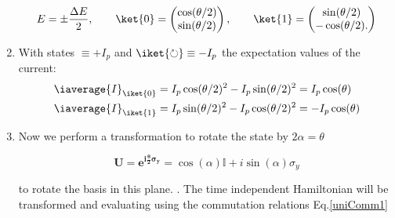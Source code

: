 \begin{enumerate}
 \begin{equation}
   E = \pm \frac{\Delta E}{2}, \qquad \ket{0} = \begin{pmatrix}
     \cos(\theta/2) \\ \sin(\theta/2)
   \end{pmatrix},  \qquad \ket{1}  =  \begin{pmatrix} \sin(\theta/2)  \\
     -\cos(\theta/2).
   \end{pmatrix}
 \end{equation}
\item     With    states     \iket{\circlearrowleft}    $     \equiv    +I_p     $    and
  $ \iket{\circlearrowright} \equiv -I_p $ the expectation values of the current:
  \begin{equation}
    \begin{aligned}
      \iaverage{I}_{\iket{0}} & = I_p\cos(\theta/2)^2 - I_p \sin(\theta/2)^2 = I_p\cos(\theta)\\
      \iaverage{I}_{\iket{1}} & = I_p\sin(\theta/2)^2 - I_p \cos(\theta/2)^2 = - I_p\cos(\theta)\\
    \end{aligned}
  \end{equation}
\item  Now  we  perform  a  transformation to  rotate  the  state  by
  $ 2\alpha = \theta $

 \begin{equation}
   \mathbf{U=e^{i\frac{\theta}{2}\sigma_y}} =  \cos(\alpha)\mathbb{I}+i\sin(\alpha)\sigma_y
 \end{equation}

 \noindent to rotate the basis  in this plane. . The  {time independent Hamiltonian} will  be transformed
 and evaluating using the commutation relations Eq.\eqref{uniComm1}


\end{enumerate}

